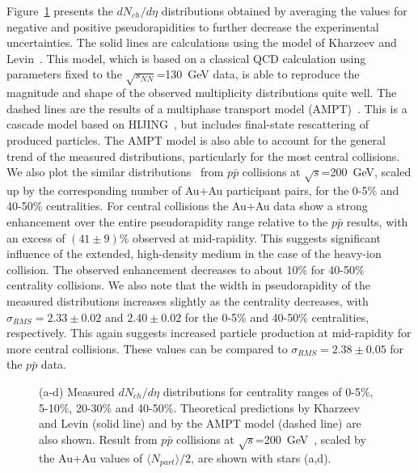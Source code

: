\documentclass[preprint,showpacs,preprintnumbers,amsmath,amssymb]{revtex4}
\begin{document}
Figure~\ref{dndeta_models} presents the $dN_{ch}/d\eta$ distributions
obtained by averaging the values for negative and positive 
pseudorapidities to further decrease the
experimental uncertainties. The solid
lines are calculations using the model of Kharzeev and
Levin~\cite{Kharzeev_and_Levin}. This model, which is based on a 
classical QCD
calculation using parameters fixed to the $\sqrt{s_{NN}}$=130~GeV
data, is able to reproduce the magnitude and shape of
the observed multiplicity distributions quite well. The 
dashed lines are the results of
a multiphase transport model (AMPT)~\cite{zhang01,lin01}. This 
is a cascade model based on HIJING~\cite{wang91}, but includes 
final-state rescattering of produced particles. The AMPT model is also able
to account for the general trend of the measured distributions,
particularly for the most central collisions. We also plot the similar
distributions~\cite{Alner86} from $p\bar p$ collisions at $\sqrt{s}$=200~GeV, 
scaled up by the corresponding number of Au+Au participant pairs, for the
0-5\% and 40-50\% centralities. 
For central collisions the Au+Au data  
show a strong enhancement over the entire pseudorapidity 
range relative to the $p\bar p$ results, with
an excess of $(41\pm 9)\%$ observed at mid-rapidity. This suggests 
significant influence of the extended, high-density medium in the case 
of the heavy-ion collision. 
The observed enhancement decreases to 
about 10\% for 40-50\% centrality collisions.  
We  also note that the width in pseudorapidity of 
the measured distributions increases slightly as the  
centrality decreases, 
with $\sigma_{RMS}=2.33\pm 0.02$ and $2.40 \pm 0.02$ 
for the 0-5\% and 40-50\% centralities, respectively. 
This again suggests increased particle production at mid-rapidity
for more central collisions. These values can be compared to 
$\sigma_{RMS}= 2.38 \pm 0.05$  for the $p\bar p$ data.  
       
\begin{figure}
  \caption{
    (a-d) Measured $dN_{ch}/d\eta$ distributions for centrality
    ranges of  0-5\%, 5-10\%, 20-30\% and 40-50\%. Theoretical
    predictions by Kharzeev and Levin (solid line) and by the
    AMPT model (dashed line) are also shown. Result from $p\bar p$ 
    collisions 
    at $\sqrt{s}$=200~GeV~\cite{Alner86}, scaled by the Au+Au
    values of $\langle N_{part}\rangle/2$, 
    are shown with stars (a,d).}
  \label{dndeta_models}
\end{figure}
\end{document}

